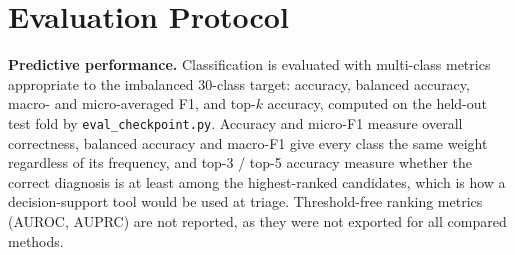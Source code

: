 \section{Evaluation Protocol}
\label{sec:eval-protocol}

\textbf{Predictive performance.} Classification is evaluated with multi-class
metrics appropriate to the imbalanced 30-class target: accuracy, balanced
accuracy, macro- and micro-averaged F1, and top-$k$ accuracy, computed on the
held-out test fold by \texttt{eval\_checkpoint.py}. Accuracy and micro-F1
measure overall correctness, balanced accuracy and macro-F1 give every class
the same weight regardless of its frequency, and top-3 / top-5 accuracy measure
whether the correct diagnosis is at least among the highest-ranked candidates,
which is how a decision-support tool would be used at triage. Threshold-free
ranking metrics (AUROC, AUPRC) are not reported, as they were not exported for
all compared methods.

